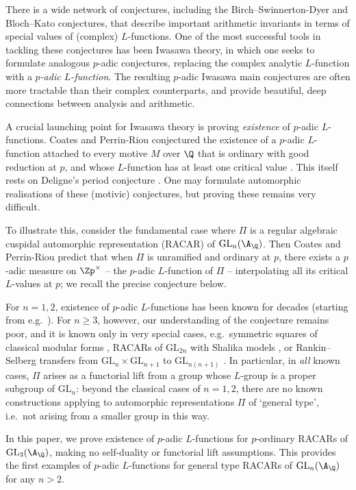 \documentclass[10pt,reqno,a4paper]{amsart}
\newcommand{\GL}{\mathrm{GL}}
\begin{document}
There is a wide network of conjectures, including the Birch--Swinnerton-Dyer and Bloch--Kato conjectures, that describe important arithmetic invariants in terms of special values of (complex) $L$-functions. One of the most successful tools in tackling these conjectures has been Iwasawa theory, in which one seeks to formulate analogous $p$-adic conjectures, replacing the complex analytic $L$-function with a \emph{$p$-adic $L$-function}. The resulting $p$-adic Iwasawa main conjectures are often more tractable than their complex counterparts, and provide beautiful, deep connections between analysis and arithmetic.

A crucial launching point for Iwasawa theory is proving \emph{existence} of $p$-adic $L$-functions. Coates and Perrin-Riou conjectured the existence of a $p$-adic $L$-function attached to every motive $M$ over $\Q$ that is ordinary with good reduction at $p$, and whose $L$-function has at least one critical value \cite{coatesperrinriou89,coates89}. This itself rests on Deligne's period conjecture \cite{Del79}. One may formulate automorphic realisations of these (motivic) conjectures, but proving these remains very difficult.

To illustrate this, consider the fundamental case where $\Pi$ is a regular algebraic cuspidal automorphic representation (RACAR) of $\GL_n(\A_{\Q})$. Then Coates and Perrin-Riou predict that when $\Pi$ is unramified and ordinary at $p$, there exists a $p$-adic measure on $\Zp^\times$ -- the $p$-adic $L$-function of $\Pi$ -- interpolating all its critical $L$-values at $p$; we recall the precise conjecture below.

For $n=1,2$, existence of $p$-adic $L$-functions has been known for decades (starting from e.g.\ \cite{KL64,MSD74}). For $n \geq 3$, however, our understanding of the conjecture remains poor, and it is known only in very special cases, e.g.\ symmetric squares of classical modular forms \cite{Sch88,Hid90,DD97}, RACARs of $\GL_{2n}$ with Shalika models \cite{AG94,Geh18, DJR18}, or Rankin--Selberg transfers from $\GL_n \times \GL_{n+1}$ to $\GL_{n(n+1)}$ \cite{Sch93,KMS00,Jan-Non-Abelian}. In particular, in \emph{all} known cases, $\Pi$ arises as a functorial lift from a group whose $L$-group is a proper subgroup of $\GL_n$: beyond the classical cases  of $n=1, 2$, there are no known constructions applying to automorphic representations $\Pi$ of `general type', i.e.\ not arising from a smaller group in this way.

In this paper, we prove existence of $p$-adic $L$-functions for $p$-ordinary RACARs of $\GL_3(\A_{\Q})$, making no self-duality or functorial lift assumptions. 	This provides the first examples of $p$-adic $L$-functions for general type RACARs of $\GL_n(\A_{\Q})$ for any $n > 2$.
\end{document}
